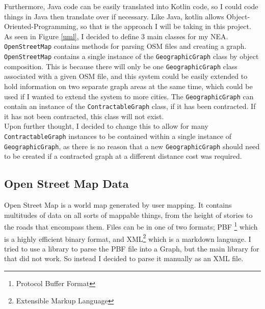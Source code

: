 \documentclass[11pt,twoside,a4paper]{report}
\begin{document}
Furthermore, Java code can be easily translated into Kotlin code, so I could code things in Java then translate over if necessary. Like Java, kotlin allows Object-Oriented-Programming, so that
is the approach I will be taking in this project.\\
As seen in Figure \ref{uml}, I decided to define 3 main classes for my NEA. \texttt{OpenStreetMap} contains methods for parsing OSM files and creating a graph.
\texttt{OpenStreetMap} contains a single instance of the \texttt{GeographicGraph} class by object composition. This is because there will only be one \texttt{GeographicGraph}
class associated with a given OSM file, and this system could be easily extended to hold information on two separate graph areas at the same time, which could be used if I wanted
to extend the system to more cities. The \texttt{GeographicGraph} can contain an instance of the \texttt{ContractableGraph} class, if it has been contracted. If it has not been contracted,
this class will not exist.\\
Upon further thought, I decided to change this to allow for many \texttt{ContractableGraph} instances to be contained within a single instance of \texttt{GeographicGraph}, as there is no reason that a new \texttt{GeographicGraph} should need to be created
 if a contracted graph at a different distance cost was required. \\
\subsection{Open Street Map Data}
Open Street Map is a world map generated by user mapping. It contains multitudes of data on all sorts of mappable things, from the height of stories to the roads that encompass them.
Files can be in one of two formats; PBF \footnote{Protocol Buffer Format} which is a highly efficient binary format, and XML\footnote{Extensible Markup Language} which is a markdown language. I tried to use a library to parse 
the PBF file into a Graph, but the main library for that did not work. So instead I decided to parse it manually as an XML file.\\
\end{document}
